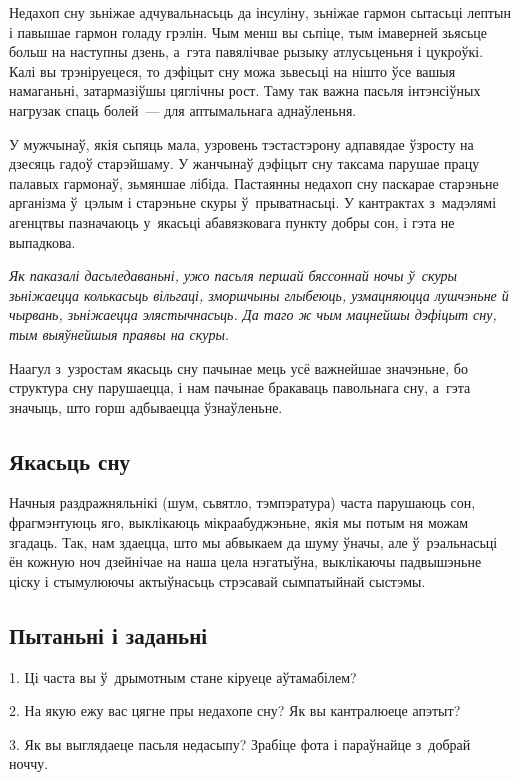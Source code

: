 Недахоп сну зьніжае адчувальнасьць да інсуліну, зьніжае гармон сытасьці лептын і павышае гармон голаду грэлін. Чым менш вы сьпіце, тым імаверней зьясьце больш на наступны дзень, а~гэта павялічвае рызыку атлусьценьня і цукроўкі. Калі вы трэніруецеся, то дэфіцыт сну можа зьвесьці на нішто ўсе вашыя намаганьні, затармазіўшы цяглічны рост. Таму так важна пасьля інтэнсіўных нагрузак спаць болей~--- для аптымальнага аднаўленьня.

У мужчынаў, якія сьпяць мала, узровень тэстастэрону адпавядае ўзросту на дзесяць гадоў старэйшаму. У жанчынаў дэфіцыт сну таксама парушае працу палавых гармонаў, зьмяншае лібіда. Пастаянны недахоп сну паскарае старэньне арганізма ў~цэлым і старэньне скуры ў~прыватнасьці. У кантрактах з~мадэлямі агенцтвы пазначаюць у~якасьці абавязковага пункту добры сон, і гэта не выпадкова. 

\emph{Як паказалі дасьледаваньні, ужо пасьля першай бяссоннай ночы ў~скуры зьніжаецца колькасьць вільгаці, зморшчыны глыбеюць, узмацняюцца лушчэньне й чырвань, зьніжаецца элястычнасьць. Да таго ж чым мацнейшы дэфіцыт сну, тым выяўнейшыя праявы на скуры.}

Наагул з~узростам якасьць сну пачынае мець усё важнейшае значэньне, бо структура сну парушаецца, і нам пачынае бракаваць павольнага сну, а~гэта значыць, што горш адбываецца ўзнаўленьне. 


\subsection*{Якасьць сну} Начныя раздражняльнікі (шум, сьвятло, тэмпэратура) часта парушаюць сон, фрагмэнтуюць яго, выклікаюць мікраабуджэньне, якія мы потым ня можам згадаць. Так, нам здаецца, што мы абвыкаем да шуму ўначы, але ў~рэальнасьці ён кожную ноч дзейнічае на наша цела нэгатыўна, выклікаючы падвышэньне ціску і стымулюючы актыўнасьць стрэсавай сымпатыйнай сыстэмы.

\subsection*{Пытаньні і заданьні}

1. Ці часта вы ў~дрымотным стане кіруеце аўтамабілем?

2. На якую ежу вас цягне пры недахопе сну? Як вы кантралюеце апэтыт?

3. Як вы выглядаеце пасьля недасыпу? Зрабіце фота і параўнайце з~добрай ноччу.


